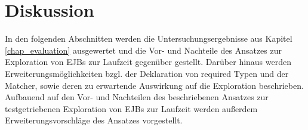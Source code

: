 \chapter{Diskussion}\label{chap_disc}
In den folgenden Abschnitten werden die Untersuchungsergebnisse aus Kapitel \ref{chap_evaluation} ausgewertet und die Vor- und Nachteile des Ansatzes zur Exploration von EJBs zur Laufzeit gegenüber gestellt. Darüber hinaus werden Erweiterungsmöglichkeiten bzgl. der Deklaration von required Typen und der Matcher, sowie deren zu erwartende Auswirkung auf die Exploration beschrieben. Aufbauend auf den Vor- und Nachteilen des beschriebenen Ansatzes zur testgetriebenen Exploration von EJBs zur Laufzeit werden außerdem Erweiterungsvorschläge des Ansatzes vorgestellt.


 
